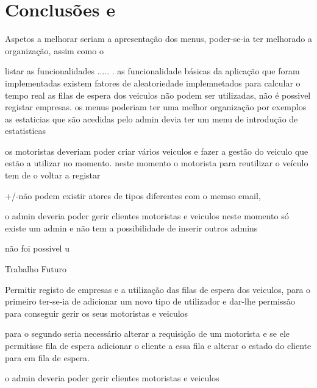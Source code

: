\chapter{Conclusões e }

Aspetos a melhorar seriam a apresentação dos menus, poder-se-ia ter melhorado a organização, assim como o 

listar as funcionalidades ..... 
. as funcionalidade básicas da aplicação que foram implementadas 
existem fatores de aleatoriedade implemnetados para calcular o tempo real 
as filas de espera dos veiculos não podem ser utilizadas, 
não é possivel registar empresas. 
os menus poderiam ter uma melhor organização por exemplos as estaticias que são acedidas pelo admin devia ter um menu de introdução de estatisticas 

os motoristas deveriam poder criar vários veiculos e fazer a gestão do veiculo que estão a utilizar no momento. neste momento o motorista para reutilizar o veículo tem de o voltar a registar 

+/-não podem existir atores de tipos diferentes com o memso email, 

o admin deveria poder gerir clientes motoristas e veiculos 
neste momento só existe um admin e não tem a possibilidade de inserir outros admins 

não foi possivel u

Trabalho Futuro

Permitir registo de empresas e a utilização das filas de espera dos veiculos, para o primeiro ter-se-ia de adicionar um novo tipo de utilizador e dar-lhe permissão para conseguir gerir os seus motoristas e veiculos 

para o segundo seria necessário alterar a requisição de um motorista e  se ele permitisse fila de espera adicionar o cliente a essa fila e alterar o estado do cliente para em fila de espera. 

o admin deveria poder gerir clientes motoristas e veiculos




